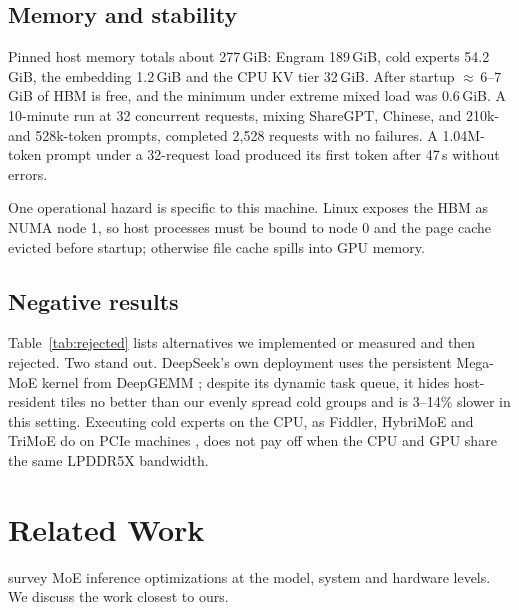 \documentclass{article}
\newcommand{\tabref}[1]{Table~\ref{#1}}
\begin{document}
\subsection{Memory and stability}
Pinned host memory totals about 277\,GiB: Engram 189\,GiB, cold experts 54.2\,GiB, the embedding 1.2\,GiB and the CPU
KV tier 32\,GiB. After startup ${\approx}\,6$--$7$\,GiB of HBM is free, and the minimum under extreme mixed load was
0.6\,GiB. A 10-minute run at 32 concurrent requests, mixing ShareGPT, Chinese, and 210k- and 528k-token prompts,
completed 2,528 requests with no failures. A 1.04M-token prompt under a 32-request load produced its first token after
47\,s without errors.

One operational hazard is specific to this machine. Linux exposes the HBM as NUMA node 1, so host processes must be
bound to node 0 and the page cache evicted before startup; otherwise file cache spills into GPU memory.

\subsection{Negative results}
\tabref{tab:rejected} lists alternatives we implemented or measured and then rejected. Two stand out. DeepSeek's own
deployment \citep{deepseekv41} uses the persistent Mega-MoE kernel from DeepGEMM \citep{deepgemm}; despite its dynamic
task queue, it hides host-resident tiles no better than our evenly spread cold groups and is 3--14\% slower in this
setting. Executing cold experts on the CPU, as Fiddler, HybriMoE and TriMoE do on PCIe machines
\citep{fiddler,hybrimoe,trimoe}, does not pay off when the CPU and GPU share the same LPDDR5X bandwidth.


\section{Related Work}\label{sec:related}
\citet{moesurvey} survey MoE inference optimizations at the model, system and hardware levels. We discuss the work
closest to ours.
\end{document}
